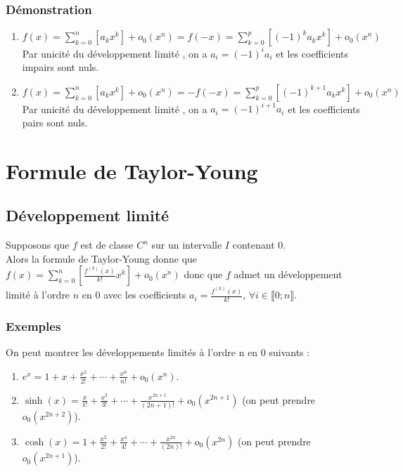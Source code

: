 \documentclass[a4paper,10pt]{book} %
\newcommand{\dl}{développement limité }
\begin{document}
\subsubsection{Démonstration}
\begin{enumerate}
\item $\displaystyle f(x)=\sum\limits_{k=0}^{n}[a_kx^{k}]+o_0(x^{n})=f(-x)=\sum\limits_{k=0}^{p}[(-1)^ka_kx^{k}]+o_0(x^{n})$\\
Par unicité du \dl, on a $a_i=(-1)^ia_i$ et les coefficients impairs sont nuls.\\

\item $\displaystyle f(x)=\sum\limits_{k=0}^{n}[a_kx^{k}]+o_0(x^{n})=-f(-x)=\sum\limits_{k=0}^{p}[(-1)^{k+1}a_kx^{k}]+o_0(x^{n})$\\
Par unicité du \dl, on a $a_i=(-1)^{i+1}a_i$ et les coefficients pairs sont nuls.
\end{enumerate}

\newpage

\section{Formule de Taylor-Young}
\subsection{Développement limité}
Supposons que $f$ est de classe $C^n$ sur un intervalle $I$ contenant 0.\\
Alors la formule de Taylor-Young donne que $\displaystyle f(x)=\sum\limits_{k=0}^{n}[\frac{f^{(k)}(x)}{k!}x^k]+o_0(x^{n})$ donc que $f$ admet un \dl à l'ordre $n$ en 0 avec les coefficients $a_i=\frac{f^{(k)}(x)}{k!}$, $\forall i\in \llbracket 0; n\rrbracket$.

\subsubsection{Exemples}
On peut montrer les développements limités à l'ordre n en 0 suivants :

\begin{enumerate}
\item $e^x=1+x+\frac{x^2}{2!}+\cdots+\frac{x^n}{n!}+o_0(x^n)$.

\item $\sinh(x)=\frac{x}{1!}+\frac{x^3}{3!}+\cdots+\frac{x^{2n+1}}{(2n+1)!}+o_0(x^{2n+1})$ (on peut prendre $o_0(x^{2n+2})$).

\item $\cosh(x)=1+\frac{x^2}{2!}+\frac{x^4}{4!}+\cdots+\frac{x^{2n}}{(2n)!}+o_0(x^{2n})$ (on peut prendre $o_0(x^{2n+1})$).
\end{enumerate}
\end{document}
